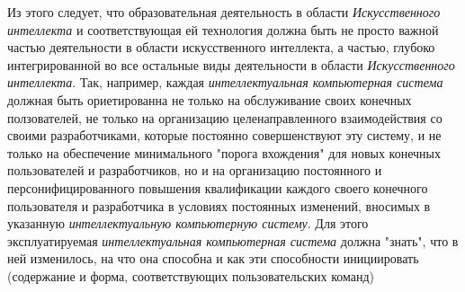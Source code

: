 {{Из этого следует, что образовательная деятельность в области \textit{Искусственного интеллекта} и соответствующая ей технология должна быть не просто важной частью деятельности в области искусственного интеллекта, а частью, глубоко интегрированной во все остальные виды деятельности в области \textit{Искусственного интеллекта}. Так, например, каждая \textit{интеллектуальная компьютерная система} должная быть ориетированна не только на обслуживание своих конечных ползователей, не только на организацию целенаправленного взаимодействия со своими разработчиками, которые постоянно совершенствуют эту систему, и не только на обеспечение минимального "порога вхождения"{} для новых конечных пользователей и разработчиков, но и на организацию постоянного и персонифицированного повышения квалификации каждого своего конечного пользователя и разработчика в условиях постоянных изменений, вносимых в указанную \textit{интеллектуальную компьютерную систему}. Для этого эксплуатируемая \textit{интеллектуальная компьютерная система} должна "знать"{}, что в ней изменилось, на что она способна и как эти способности инициировать (содержание и форма, соответствующих пользовательских команд)
}
}

\scnendstruct

